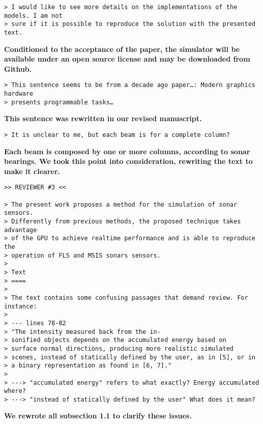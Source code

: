 \documentclass{article}
\begin{document}
\begin{verbatim}
> I would like to see more details on the implementations of the models. I am not
> sure if it is possible to reproduce the solution with the presented text.
\end{verbatim}

\textbf{Conditioned to the acceptance of the paper, the simulator will be available
under an open source license and may be downloaded from Github.}

\begin{verbatim}
> This sentence seems to be from a decade ago paper…: Modern graphics hardware
> presents programmable tasks…
\end{verbatim}

\textbf{This sentence was rewritten in our revised manuscript.}

\begin{verbatim}
> It is unclear to me, but each beam is for a complete column?
\end{verbatim}

\textbf{Each beam is composed by one or more columns, according to sonar
bearings. We took this point into consideration, rewriting the text to make
it clearer.}

\begin{verbatim}
>> REVIEWER #3 <<

> The present work proposes a method for the simulation of sonar sensors.
> Differently from previous methods, the proposed technique takes advantage
> of the GPU to achieve realtime performance and is able to reproduce the
> operation of FLS and MSIS sonars sensors.
>
> Text
> ====
>
> The text contains some confusing passages that demand review. For instance:
>
> --- lines 78-82
> "The intensity measured back from the in-
> sonified objects depends on the accumulated energy based on
> surface normal directions, producing more realistic simulated
> scenes, instead of statically defined by the user, as in [5], or in
> a binary representation as found in [6, 7]."
>
> ---> "accumulated energy" refers to what exactly? Energy accumulated where?
> ---> "instead of statically defined by the user" What does it mean?
\end{verbatim}

\textbf{We rewrote all subsection 1.1 to clarify these issues.}
\end{document}

